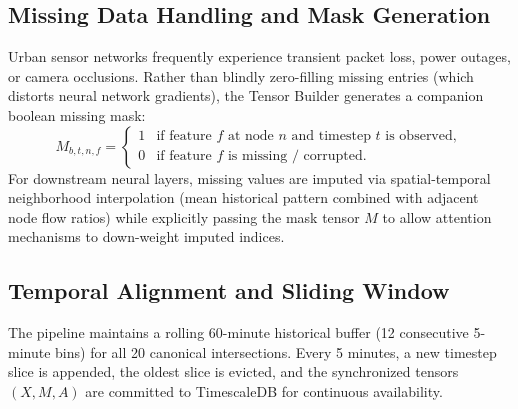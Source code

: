 \subsection{Missing Data Handling and Mask Generation}
Urban sensor networks frequently experience transient packet loss, power outages, or camera occlusions. Rather than blindly zero-filling missing entries (which distorts neural network gradients), the Tensor Builder generates a companion boolean missing mask:
\begin{equation}
  M_{b,t,n,f} = 
  \begin{cases}
    1 & \text{if feature } f \text{ at node } n \text{ and timestep } t \text{ is observed}, \\
    0 & \text{if feature } f \text{ is missing / corrupted}.
  \end{cases}
\end{equation}
For downstream neural layers, missing values are imputed via spatial-temporal neighborhood interpolation (mean historical pattern combined with adjacent node flow ratios) while explicitly passing the mask tensor $M$ to allow attention mechanisms to down-weight imputed indices.

\subsection{Temporal Alignment and Sliding Window}
The pipeline maintains a rolling 60-minute historical buffer (12 consecutive 5-minute bins) for all 20 canonical intersections. Every 5 minutes, a new timestep slice is appended, the oldest slice is evicted, and the synchronized tensors $(X, M, A)$ are committed to TimescaleDB for continuous availability.
